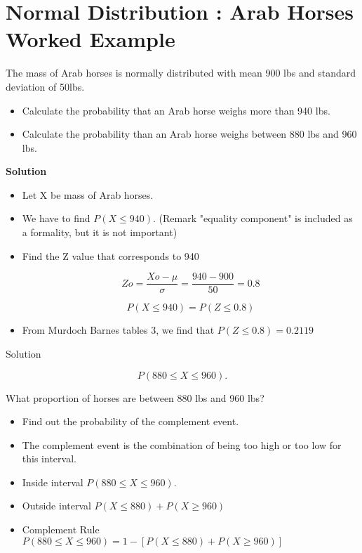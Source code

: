\section{Normal Distribution : Arab Horses Worked Example}
The mass of Arab horses is normally distributed with mean 900 lbs and standard deviation of 50lbs.
\begin{itemize}
	
	\item  Calculate the probability that an Arab horse weighs more than 940 lbs.
	\item Calculate the probability than an Arab horse weighs between 880 lbs and 960 lbs.
\end{itemize}

\noindent \textbf{Solution}\\

\begin{itemize}
	\item Let X be mass of Arab horses.
	
	\item We have to find $P(X\leq940)$.            (Remark "equality component" is included as a formality, but it is not important)
	
	
	\item	Find the Z value that corresponds to 940 
	
	\[Zo=\frac{Xo-\mu}{\sigma}= \frac{940 -900}{50}= 0.8\]
	
	\[P(X \leq 940) = P(Z \leq 0.8) \]
	
	
	\item		From Murdoch Barnes tables 3, we find that $P(Z \leq 0.8) = 0.2119$
\end{itemize}





Solution 

\[P ( 880 \leq X \leq 960).\]


What proportion of horses are between 880 lbs and 960 lbs?
\begin{itemize}
	\item Find out the probability of the complement event.
	\item The complement event is the combination of being too high  or too low for this interval.
	
	\item Inside interval $P ( 880 \leq X \leq 960).$
	
	\item Outside interval $P (X \leq 880) + P(X \geq 960)$
	
	\item Complement Rule $P ( 880\leq X \leq 960)  = 1 - [P (X\leq 880) +P(X\geq 960)]$
	
\end{itemize}



